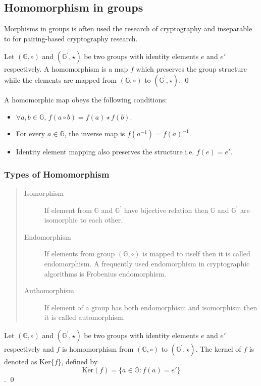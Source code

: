 \subsection{Homomorphism in groups }
Morphisms in groups is often used the research of cryptography and inseparable to for pairing-based cryptography research.
\begin{definition}
	Let $(\mathbb{G},\circ)$ and $(\mathbb{G}^{'},\star)$ be two groups with identity elements $e$ and $e'$ respectively.
	A homomorphism  is a map $f$ which preserves the group structure while the elements are mapped from $(\mathbb{G},\circ)$ to $(\mathbb{G}^{'},\star)$.
	\qed
\end{definition}
	A homomorphic map obeys the following conditions:
	\begin{itemize}
		\item $\forall a,b \in \mathbb{G}$, $f(a \circ b) = f(a) \star f(b)$.
		\item  For every $a \in \mathbb{G}$, the inverse map is $f(a^{-1}) = f(a)^{-1}$.
		\item  Identity element mapping also preserves the structure i.e. $f(e) =e'$.
	\end{itemize}

\subsubsection{Types of Homomorphism}
\begin{quote}
	\begin{description}
				\item[Isomorphism ] If element from $\mathbb{G}$  and $\mathbb{G}^{'}$ have bijective relation then $\mathbb{G}$ and $\mathbb{G}^{'}$ are isomorphic to each other.
					
			\item[Endomorphism  ]  If elements from group $(\mathbb{G},\circ)$ is mapped to itself then it is called endomorphism. 
			A frequently used endomorphism in cryptographic algorithms is Frobenius endomorphism. 
			
			\item[Authomorphism  ] If element of a group has both endomorphism and isomorphism then it is called automorphism.
	\end{description}
\end{quote}

\begin{definition}
	Let $(\mathbb{G},\circ)$ and $(\mathbb{G}^{'},\star)$ be two groups with identity elements $e$ and $e'$ respectively and $f$ is homomorphism from $(\mathbb{G},\circ)$ to $(\mathbb{G}^{'},\star)$.
	The kernel of $f$ is denoted as $\text{Ker}\{f\}$, defined by 
	$$\text{Ker}(f) = \{ a \in \mathbb{G}: f(a) = e'\}$$.
	\qed
\end{definition}

